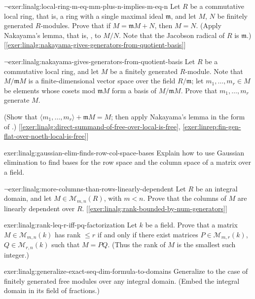 \begin{exer}{$\lnot$}{exer:linalg:local-ring-m-eq-mm-plus-n-implies-m-eq-n}
  Let $R$ be a commutative local ring, that is, a ring with a single
  maximal ideal $\mathfrak{m}$, and let $M$, $N$ be finitely generated
  $R$-modules. Prove that if $M = \mathfrak{m}M + N$, then $M = N$.
  (Apply Nakayama's lemma, that is,
  , to $M/N$. Note that the Jacobson
  radical of $R$ is $\mathfrak{m}$.)
  [\ref{exer:linalg:nakayama-gives-generators-from-quotient-basis}]
\end{exer}
\begin{exer}{$\lnot$}{exer:linalg:nakayama-gives-generators-from-quotient-basis}
  Let $R$ be a commutative local ring, and let $M$ be a finitely
  generated $R$-module. Note that $M/\mathfrak{m}M$ is a
  finite-dimensional vector space over the field $R/\mathfrak{m}$; let
  $m_1, \dots, m_r \in M$ be elements whose cosets mod $\mathfrak{m}M$
  form a basis of $M/\mathfrak{m}M$. Prove that $m_1, \dots, m_r$
  generate $M$.

  (Show that $\langle m_1, \dots, m_r \rangle + \mathfrak{m}M = M$;
  then apply Nakayama's lemma in the form of
  .)
  [\ref{exer:linalg:direct-summand-of-free-over-local-is-free},
  \ref{exer:linrep:fin-gen-flat-over-noeth-local-is-free}]
\end{exer}
\begin{exer}{}{exer:linalg:gaussian-elim-finds-row-col-space-bases}
  Explain how to use Gaussian elimination to find bases for the row
  space and the column space of a matrix over a field.
\end{exer}
\begin{exer}{$\lnot$}{exer:linalg:more-columns-than-rows-linearly-dependent}
  Let $R$ be an integral domain, and let $M \in \mathcal{M}_{m,n}(R)$,
  with $m < n$. Prove that the columns of $M$ are linearly dependent
  over $R$. [\ref{exer:linalg:rank-bounded-by-num-generators}]
\end{exer}
\begin{exer}{}{exer:linalg:rank-leq-r-iff-pq-factorization}
  Let $k$ be a field. Prove that a matrix $M \in \mathcal{M}_{m,n}(k)$
  has rank $\leq r$ if and only if there exist matrices
  $P \in \mathcal{M}_{m,r}(k)$, $Q \in \mathcal{M}_{r,n}(k)$ such that
  $M = PQ$. (Thus the rank of $M$ is the smallest such integer.)
\end{exer}
\begin{exer}{}{exer:linalg:generalize-exact-seq-dim-formula-to-domains}
  Generalize  to the case of finitely generated free
  modules over any integral domain. (Embed the integral domain in its
  field of fractions.)
\end{exer}
